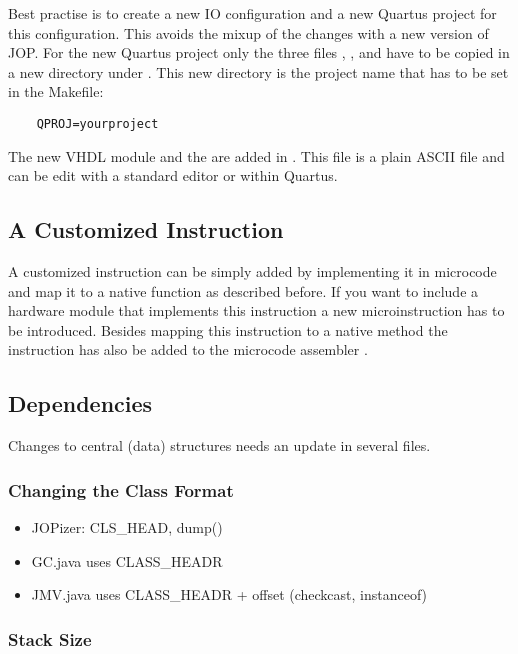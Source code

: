 Best practise is to create a new IO configuration
 and a new Quartus project for this
configuration. This avoids the mixup of the changes with a new
version of JOP. For the new Quartus project only the three files
, , and  have to be copied
in a new directory under . This new directory is the
project name that has to be set in the Makefile:

\begin{verbatim}
    QPROJ=yourproject
\end{verbatim}

The new VHDL module and the  are added in
. This file is a plain ASCII file and can be edit with
a standard editor or within Quartus.

\subsection{A Customized Instruction}

A customized instruction can be simply added by implementing it in
microcode and map it to a native function as described before. If
you want to include a hardware module that implements this
instruction a new microinstruction has to be introduced. Besides
mapping this instruction to a native method the instruction has also
be added to the microcode assembler .

\subsection{Dependencies}

Changes to central (data) structures needs an update in several
files.

\subsubsection{Changing the Class Format}

\begin{itemize}
    \item JOPizer: CLS\_HEAD, dump()
    \item GC.java uses CLASS\_HEADR
    \item JMV.java uses CLASS\_HEADR + offset (checkcast, instanceof)
\end{itemize}

\subsubsection{Stack Size}

